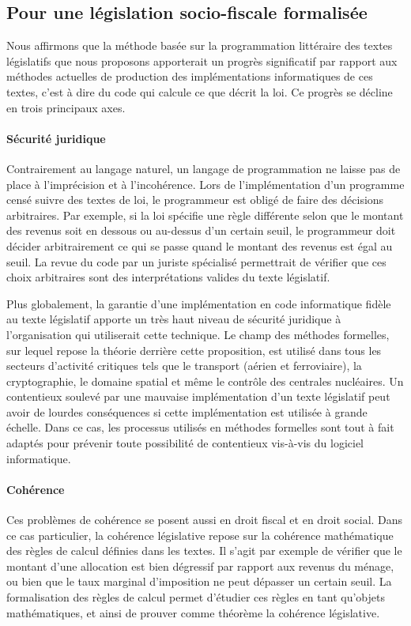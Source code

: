 \subsection{Pour une législation socio-fiscale formalisée}

Nous affirmons que la méthode basée sur la programmation littéraire des textes législatifs que nous proposons apporterait un progrès significatif par rapport aux méthodes actuelles de production des implémentations informatiques de ces textes, c'est à dire du code qui calcule ce que décrit la loi. Ce progrès se décline en trois principaux axes.

\paragraph{Sécurité juridique} Contrairement au langage naturel, un langage de programmation ne laisse pas de place à l'imprécision et à l'incohérence. Lors de l'implémentation d'un programme censé suivre des textes de loi, le programmeur est obligé de faire des décisions arbitraires. Par exemple, si la loi spécifie une règle différente selon que le montant des revenus soit en dessous ou au-dessus d'un certain seuil, le programmeur doit décider arbitrairement ce qui se passe quand le montant des revenus est égal au seuil. La revue du code par un juriste spécialisé permettrait de vérifier que ces choix arbitraires sont des interprétations valides du texte législatif.

Plus globalement, la garantie d'une implémentation en code informatique fidèle au texte législatif apporte un très haut niveau de sécurité juridique à l'organisation qui utiliserait cette technique. Le champ des méthodes formelles, sur lequel repose la théorie derrière cette proposition, est utilisé dans tous les secteurs d'activité critiques tels que le transport (aérien et ferroviaire), la cryptographie, le domaine spatial et même le contrôle des centrales nucléaires. Un contentieux soulevé par une mauvaise implémentation d'un texte législatif peut avoir de lourdes conséquences si cette implémentation est utilisée à grande échelle. Dans ce cas, les processus utilisés en méthodes formelles sont tout à fait adaptés pour prévenir toute possibilité de contentieux vis-à-vis du logiciel informatique.

\paragraph{Cohérence} Ces problèmes de cohérence se posent aussi en droit fiscal et en droit social. Dans ce cas particulier, la cohérence législative repose sur la cohérence mathématique des règles de calcul définies dans les textes. Il s'agit par exemple de vérifier que le montant d'une allocation est bien dégressif par rapport aux revenus du ménage, ou bien que le taux marginal d'imposition ne peut dépasser un certain seuil. La formalisation des règles de calcul permet d'étudier ces règles en tant qu'objets mathématiques, et ainsi de prouver comme théorème la cohérence législative.


